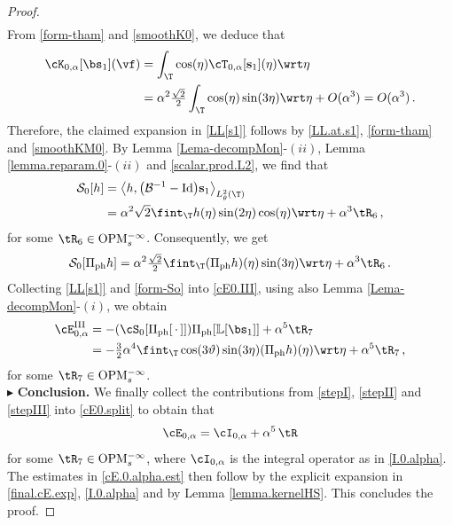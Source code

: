 \documentclass[a4paper,reqno,10pt]{article}
\newcommand{\OpM}{{\rm O}{\rm P}{\rm M}}
\newcommand{\LL}{\mathbb{L}}
\begin{document}
\begin{proof}
\begin{align}
	\end{align}	
From  \eqref{form-tham} and \eqref{smoothK0}, we deduce that
	\begin{align}
		\cK_{0,\alpha}[\bs_{1}](\vf) & = \int_{\T} \cos(\eta) \cT_{0,\alpha}[\mathbf{s}_1](\eta) \wrt\eta \\
		& =\alpha^2\tfrac{\sqrt{2}}{2} \int_{\T} \cos(\eta)\sin(3\eta)  \wrt\eta+O(\alpha^3) =O(\alpha^3)\,.\label{smoothKM0}
	\end{align}
Therefore, the claimed expansion in \eqref{LL[s1]} follows by \eqref{LL.at.s1}, \eqref{form-tham} and \eqref{smoothKM0}.  By Lemma \ref{Lema-decompMon}-$(ii)$, Lemma \ref{lemma.reparam.0}-$(ii)$ and \eqref{scalar.prod.L2}, we find that
        \begin{align}
        \nonumber\mathcal{S}_0[h]&=\big\langle h,  \big(\mathcal{B}^{-1}-\textnormal{Id}\big)\mathbf{s}_1  \big\rangle_{L^2_\theta(\T)}\,\\
        &=\alpha^2\sqrt{2}\fint_{\T} h(\eta)  \sin(2\eta)\cos(\eta)\wrt \eta+ \alpha^3 \tR_{6} \,,
        \end{align}
        for some $\tR_{6} \in \OpM_{s}^{-\infty}$. 
        Consequently, we get
        \begin{align}\label{form-So}
            \mathcal{S}_0[\Pi_{\rm ph}h]=\alpha^2\tfrac{\sqrt{2}}{2}\fint_{\T} (\Pi_{\rm ph}h)(\eta)  \sin(3\eta)\wrt\eta+ \alpha^3 \tR_{6}\,.
        \end{align}
Collecting \eqref{LL[s1]} and \eqref{form-So} into \eqref{cE0.III}, using also Lemma \ref{Lema-decompMon}-$(i)$, we obtain
\begin{align}
    \cE_{0,\alpha}^{\rm III} & = - (\cS_{0}[\Pi_{\rm ph}[\,\cdot\,]])\Pi_{\rm ph}[\LL[\bs_{1}]]  + \alpha^5 \tR_{7} \\
    & = - \tfrac32  \alpha^4\fint_{\T} \cos(3\vartheta) \sin(3\eta) (\Pi_{\rm ph}h)(\eta) \wrt\eta + \alpha^5 \tR_{7}\,, \label{stepIII}
\end{align}
for some $\tR_{7} \in \OpM_{s}^{-\infty}$. 
\\[1mm]
\noindent  $\blacktriangleright$ {\bf Conclusion.} We finally collect the contributions from  \eqref{stepI}, \eqref{stepII} and \eqref{stepIII} into \eqref{cE0.split} to obtain that 
\begin{equation}\label{final.cE.exp}
    \cE_{0,\alpha} = \cI_{0,\alpha} + \alpha^5 \,\tR
\end{equation}
for some $\tR_{7} \in \OpM_{s}^{-\infty}$, where $\cI_{0,\alpha}$ is the integral operator as in \eqref{I.0.alpha}. The estimates in \eqref{cE.0.alpha.est} then follow by the explicit expansion in \eqref{final.cE.exp}, \eqref{I.0.alpha} and by Lemma \ref{lemma.kernelHS}.
This concludes the proof.             
\end{proof}
\end{document}
